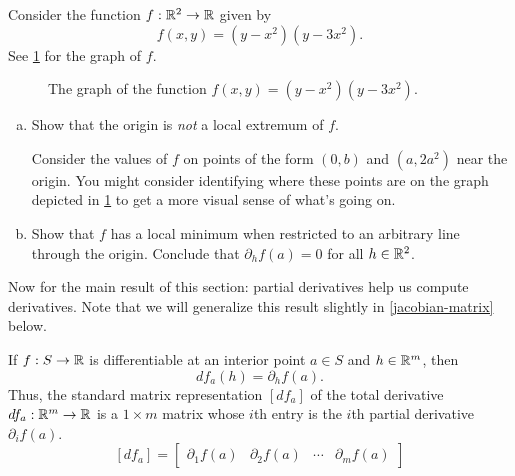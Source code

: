 \begin{exercise} \label{all-directionals-vanish-but-not-extremum}
	Consider the function $f : \mathbb{R}^2 \to \mathbb{R}$ given by 
	\[ f(x, y) = (y- x^2)(y - 3x^2). \]
	See \cref{all-directionals-vanish-but-not-extremum-graph} for the graph of $f$. 
	\begin{figure}[ht]
		\begin{center}
		\end{center}
		\caption{The graph of the function  $f(x,y) = (y- x^2)(y - 3x^2)$.} \label{all-directionals-vanish-but-not-extremum-graph}
	\end{figure}
	\begin{enumerate}[(a)]
		\item Show that the origin is \emph{not} a local extremum of $f$. \begin{hint} Consider the values of $f$ on points of the form $(0,b)$ and $(a, 2a^2)$ near the origin. You might consider identifying where these points are on the graph depicted in \cref{all-directionals-vanish-but-not-extremum-graph} to get a more visual sense of what's going on. \end{hint}
		\item Show that $f$ has a local minimum when restricted to an arbitrary line through the origin. Conclude that $\partial_h f(a) = 0$ for all $h \in \mathbb{R}^2$. 
	\end{enumerate}
\end{exercise}

Now for the main result of this section: partial derivatives help us compute derivatives. Note that we will generalize this result slightly in \cref{jacobian-matrix} below. 

\begin{proposition} \label{differentiable-implies-directionals}
	If $f : S \to \mathbb{R}$ is differentiable at an interior point $a \in S$ and $h \in \mathbb{R}^m$, then \[ df_a(h) = \partial_h f(a). \]
	Thus, the standard matrix representation $[df_a]$ of the total derivative $df_a : \mathbb{R}^m \to \mathbb{R}$ is a $1 \times m$ matrix whose $i$th entry is the $i$th partial derivative $\partial_i f(a)$. 
	\[ [df_a] = \begin{bmatrix} \partial_1 f(a) & \partial_2 f(a) & \dotsb & \partial_m f(a) \end{bmatrix} \]
\end{proposition}


